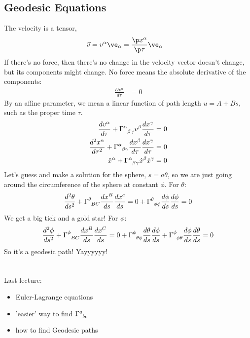 \documentclass[a4paper, 11pt, normalem]{report}
\begin{document}
\section{Geodesic Equations}
The velocity is a tensor,
\begin{align}
    \vec{v} &= v^\alpha\ve_{\alpha} = \frac{\p x^\alpha}{\p\tau}\ve_\alpha
\end{align}
If there's no force, then there's no change in the velocity vector doesn't change, but its components might change.
No force means the absolute derivative of the components:
\begin{align}
    \frac{Dv^\alpha}{d\tau} &= 0
\end{align}
By an affine parameter, we mean a linear function of path length $u=A+Bs$, such as the proper time $\tau$.
\begin{align}
    \frac{dv^\alpha}{d\tau} + \tensor{\Gamma}{^\alpha_{\beta\gamma}}v^\beta\frac{dx^\gamma}{d\tau} &= 0 \\
    \frac{d^2x^\alpha}{d\tau^2} + \tensor{\Gamma}{^\alpha_{\beta\gamma}}\frac{dx^\beta}{d\tau}\frac{dx^\gamma}{d\tau} &= 0 \\
    \ddot{x}^\alpha + \tensor{\Gamma}{^\alpha_{\beta\gamma}}\dot{x}^\beta\dot{x}^\gamma &= 0
\end{align}
Let's guess and make a solution for the sphere, $s=a\theta$, so we are just going around the circumference of the sphere at constant $\phi$.
For $\theta$:
\begin{align}
    \frac{d^2\theta}{ds^2} + \tensor{\Gamma}{^\theta_{BC}}\frac{dx^B}{ds}\frac{dx^c}{ds} = 0 + \tensor{\Gamma}{^\theta_{\phi\phi}}\frac{d\phi}{ds}\frac{d\phi}{ds} = 0
\end{align}
We get a big tick and a gold star!
For $\phi$:
\begin{align}
    \frac{d^2\phi}{ds^2} + \tensor{\Gamma}{^\phi_{BC}}\frac{dx^B}{ds}\frac{dx^C}{ds} = 0 + \tensor{\Gamma}{^\phi_{\theta\phi}}\frac{d\theta}{ds}\frac{d\phi}{ds} + \tensor{\Gamma}{^\phi_{\phi\theta}}\frac{d\phi}{ds}\frac{d\theta}{ds} = 0
\end{align}
So it's a geodesic path! Yayyyyyy!


\chapter{}

\chapter{}
Last lecture:
\begin{itemize}
    \item Euler-Lagrange equations
    \item 'easier' way to find $\tensor{\Gamma}{^a_{bc}}$
    \item how to find Geodesic paths
\end{itemize}
\end{document}
